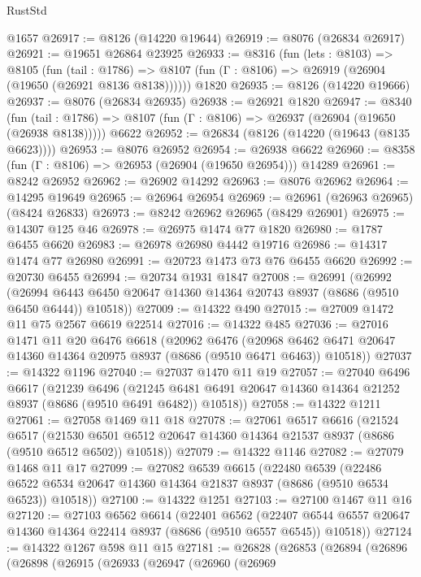 \begin{lexlean}{RustStd}
\begin{coremodule}
    @1657
@26917 := @8126 (@14220 @19644)
@26919 := @8076 (@26834 @26917)
@26921 := @19651 @26864 @23925
@26933 := @8316
    (fun (lets : @8103) =>
    @8105
      (fun (tail : @1786) =>
      @8107 (fun (Γ : @8106) => @26919 (@26904 (@19650 (@26921 @8136 @8138))))))
    @1820
@26935 := @8126 (@14220 @19666)
@26937 := @8076 (@26834 @26935)
@26938 := @26921 @1820
@26947 := @8340
    (fun (tail : @1786) => @8107 (fun (Γ : @8106) => @26937 (@26904 (@19650 (@26938 @8138)))))
    @6622
@26952 := @26834 (@8126 (@14220 (@19643 (@8135 @6623))))
@26953 := @8076 @26952
@26954 := @26938 @6622
@26960 := @8358 (fun (Γ : @8106) => @26953 (@26904 (@19650 @26954))) @14289
@26961 := @8242 @26952
@26962 := @26902 @14292
@26963 := @8076 @26962
@26964 := @14295 @19649
@26965 := @26964 @26954
@26969 := @26961 (@26963 @26965) (@8424 @26833)
@26973 := @8242 @26962 @26965 (@8429 @26901)
@26975 := @14307 @125 @46
@26978 := @26975 @1474 @77 @1820
@26980 := @1787 @6455 @6620
@26983 := @26978 @26980 @4442 @19716
@26986 := @14317 @1474 @77 @26980
@26991 := @20723 @1473 @73 @76 @6455 @6620
@26992 := @20730 @6455
@26994 := @20734 @1931 @1847
@27008 := @26991
    (@26992
      (@26994 @6443 @6450 @20647 @14360 @14364 @20743 @8937 (@8686 (@9510 @6450 @6444)) @10518))
@27009 := @14322 @490
@27015 := @27009 @1472 @11 @75 @2567 @6619 @22514
@27016 := @14322 @485
@27036 := @27016
    @1471
    @11
    @20
    @6476
    @6618
    (@20962
      @6476
      (@20968 @6462 @6471 @20647 @14360 @14364 @20975 @8937 (@8686 (@9510 @6471 @6463)) @10518))
@27037 := @14322 @1196
@27040 := @27037 @1470 @11 @19
@27057 := @27040
    @6496
    @6617
    (@21239
      @6496
      (@21245 @6481 @6491 @20647 @14360 @14364 @21252 @8937 (@8686 (@9510 @6491 @6482)) @10518))
@27058 := @14322 @1211
@27061 := @27058 @1469 @11 @18
@27078 := @27061
    @6517
    @6616
    (@21524
      @6517
      (@21530 @6501 @6512 @20647 @14360 @14364 @21537 @8937 (@8686 (@9510 @6512 @6502)) @10518))
@27079 := @14322 @1146
@27082 := @27079 @1468 @11 @17
@27099 := @27082
    @6539
    @6615
    (@22480
      @6539
      (@22486 @6522 @6534 @20647 @14360 @14364 @21837 @8937 (@8686 (@9510 @6534 @6523)) @10518))
@27100 := @14322 @1251
@27103 := @27100 @1467 @11 @16
@27120 := @27103
    @6562
    @6614
    (@22401
      @6562
      (@22407 @6544 @6557 @20647 @14360 @14364 @22414 @8937 (@8686 (@9510 @6557 @6545)) @10518))
@27124 := @14322 @1267 @598 @11 @15
@27181 := @26828
    (@26853
      (@26894
        (@26896
          (@26898
            (@26915
              (@26933
                (@26947
                  (@26960
                    (@26969

\end{coremodule}
\end{lexlean}
